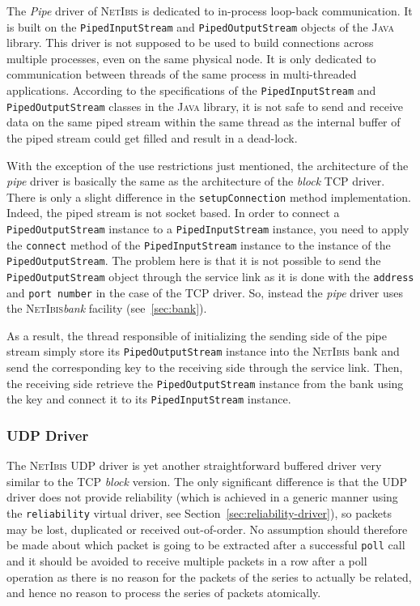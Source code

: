 \documentclass[11pt]{book}
\def\NetIbis{\textsc{NetIbis}\xspace}
\begin{document}
The \emph{Pipe} driver of \NetIbis is dedicated to in-process
loop-back communication. It is built on the \texttt{PipedInputStream}
and \texttt{PipedOutputStream} objects of the \textsc{Java} library.
This driver is not supposed to be used to build connections across
multiple processes, even on the same physical node. It is only
dedicated to communication between threads of the same process in
multi-threaded applications. According to the specifications of the
\texttt{PipedInputStream} and \texttt{PipedOutputStream} classes in
the \textsc{Java} library, it is not safe to send and receive data
on the same piped stream within the same thread as the internal buffer
of the piped stream could get filled and result in a dead-lock. 

With the exception of the use restrictions just mentioned, the
architecture of the \emph{pipe} driver is basically the same as the
architecture of the \emph{block} TCP driver. There is only a slight
difference in the \texttt{setupConnection} method implementation.
Indeed, the piped stream is not socket based. In order to connect a
\texttt{PipedOutputStream} instance to a \texttt{PipedInputStream}
instance, you need to apply the \texttt{connect} method of the
\texttt{PipedInputStream} instance to the instance of the
\texttt{PipedOutputStream}. The problem here is that it is not
possible to send the \texttt{PipedOutputStream} object through the
service link as it is done with the \texttt{address} and \texttt{port
  number} in the case of the TCP driver. So, instead the \emph{pipe}
driver uses the \NetIbis \emph{bank} facility (see~\ref{sec:bank}).

As a result, the thread responsible of initializing the sending side
of the pipe stream simply store its \texttt{PipedOutputStream}
instance into the \NetIbis bank and send the corresponding key to the
receiving side through the service link. Then, the receiving side
retrieve the \texttt{PipedOutputStream} instance from the bank using
the key and connect it to its \texttt{PipedInputStream} instance.

%
\subsubsection{UDP Driver}
\label{sec:udp-driver}
The \NetIbis UDP driver is yet another straightforward buffered driver
very similar to the TCP \emph{block} version. The only significant
difference is that the UDP driver does not provide reliability (which
is achieved in a generic manner using the \texttt{reliability} virtual
driver, see Section~\ref{sec:reliability-driver}), so packets may be
lost, duplicated or received out-of-order. No assumption should
therefore be made about which packet is going to be extracted after a
successful \texttt{poll} call and it should be avoided to receive
multiple packets in a row after a poll operation as there is no reason
for the packets of the series to actually be related, and hence no
reason to process the series of packets atomically.
\end{document}
